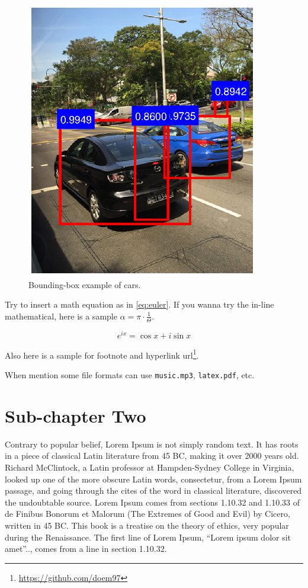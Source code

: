\begin{spacing}{1.5}
\begin{figure}[ht]
\centering
\includegraphics[width=4in, fbox]{Chapter1/boundingbox.eps}
\caption{Bounding-box example of cars.}
\label{fig:boundingboxexample} 
\end{figure}

Try to insert a math equation as in \autoref{eq:euler}. If you wanna try the in-line mathematical, here is a sample $\alpha = \pi \cdot \frac{1}{\Theta}$.

\begin{equation}
\label{eq:euler}
    e^{ix}= \cos{x} + i \sin{x}
\end{equation}

Also here is a sample for footnote and hyperlink url\footnote{\url{https://github.com/doem97}}. 

When mention some file formats can use \texttt{music.mp3}, \texttt{latex.pdf}, etc.




\section{Sub-chapter Two}

Contrary to popular belief, Lorem Ipsum is not simply random text. It has roots in a piece of classical Latin literature from 45 BC, making it over 2000 years old. Richard McClintock, a Latin professor at Hampden-Sydney College in Virginia, looked up one of the more obscure Latin words, consectetur, from a Lorem Ipsum passage, and going through the cites of the word in classical literature, discovered the undoubtable source. Lorem Ipsum comes from sections 1.10.32 and 1.10.33 of de Finibus Bonorum et Malorum (The Extremes of Good and Evil) by Cicero, written in 45 BC. This book is a treatise on the theory of ethics, very popular during the Renaissance. The first line of Lorem Ipsum, \enquote{Lorem ipsum dolor sit amet}.., comes from a line in section 1.10.32.


\end{spacing}
